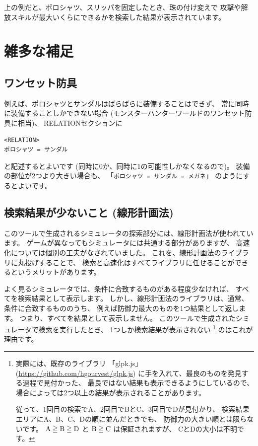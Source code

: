 \documentclass[dvipdfmx]{jsarticle}
\begin{document}
上の例だと、ポロシャツ、スリッパを固定したとき、珠の付け変えで
攻撃や解放スキルが最大いくらにできるかを検索した結果が表示されています。

\section{雑多な補足} %

\subsection{ワンセット防具}
例えば、ポロシャツとサンダルはばらばらに装備することはできず、
常に同時に装備することしかできない場合
(モンスターハンターワールドのワンセット防具に相当)、
RELATIONセクションに
\medskip
\\
{\footnotesize\begin{mdframed}\begin{Verbatim}[commandchars=|<>]
<RELATION>
ポロシャツ = サンダル
\end{Verbatim}
\end{mdframed}}
\medskip
\noindent
と記述するとよいです (同時に0か、同時に1の可能性しかなくなるので)。
装備の部位が2つより大きい場合も、
「\texttt{ポロシャツ = サンダル = メガネ}」
のようにするとよいです。

\subsection{検索結果が少ないこと (線形計画法)}
このツールで生成されるシミュレータの探索部分には、線形計画法が使われています。
ゲームが異なってもシミュレータには共通する部分がありますが、
高速化については個別の工夫がなされていました。
これを、線形計画法のライブラリに丸投げすることで、
検索と高速化はすべてライブラリに任せることができるというメリットがあります。

よく見るシミュレータでは、条件に合致するものがある程度少なければ、
すべてを検索結果として表示します。
しかし、線形計画法のライブラリは、通常、条件に合致するもののうち、
例えば防御力最大のものを1つ結果として返します。
つまり、すべてを結果として表示しません。
このツールで生成されたシミュレータで検索を実行したとき、
1つしか検索結果が表示されない%
\footnote{
実際には、既存のライブラリ
「glpk.js」(\url{https://github.com/hgourvest/glpk.js})
に手を入れて、最良のものを発見する過程で見付かった、
最良ではない結果も表示できるようにしているので、
場合によっては2つ以上の結果が表示されることがあります。
\par
従って、1回目の検索でA、2回目でBとC、3回目でDが見付かり、
検索結果エリアにA、B、C、Dの順に並んだときでも、
防御力の大きい順とは限らないです。
$\rm{A} \geqq \rm{B} \geqq \rm{D}$ と
$\rm{B} \geqq \rm{C}$ は保証されますが、
CとDの大小は不明です。
}%
のはこれが理由です。
\end{document}
